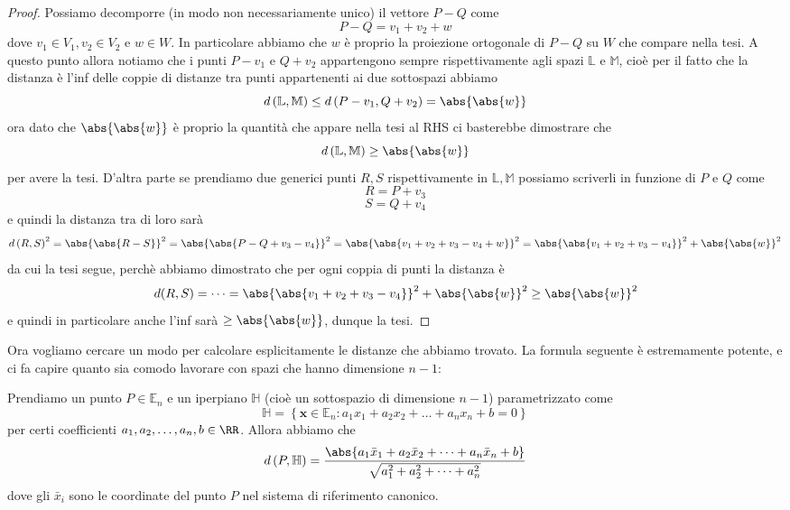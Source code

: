 \documentclass[11pt]{scrartcl}
\begin{document}
   	 \begin{proof}
   	 	Possiamo decomporre (in modo non necessariamente unico) il vettore $P-Q$ come
   	 	$$P-Q=v_1+v_2+w$$
   	 	dove $v_1\in V_1,v_2\in V_2$ e $w\in W$. In particolare abbiamo che $w$ è proprio la proiezione ortogonale di $P-Q$ su $W$ che compare nella tesi. A questo punto allora notiamo che i punti $P-v_1$ e $Q+v_2 $ appartengono sempre rispettivamente agli spazi $\mathbb{L}$ e $\mathbb{M}$, cioè per il fatto che la distanza è l'inf delle coppie di distanze tra punti appartenenti ai due sottospazi abbiamo
   	 	$$d\left(\mathbb{L},\mathbb{M}\right)\le d\left(P-v_1,Q+v_2\right)=\abs{\abs{w}}$$ 
   	 	ora dato che $\abs{\abs{w}}$ è proprio la quantità che appare nella tesi al RHS ci basterebbe dimostrare che 
   	 	$$d\left(\mathbb{L},\mathbb{M}\right)\ge \abs{\abs{w}}$$
   	 	per avere la tesi. D'altra parte se prendiamo due generici punti $R,S$ rispettivamente in $\mathbb{L},\mathbb{M}$ possiamo scriverli in funzione di $P$ e $Q$ come
   	 	$$R=P+v_3$$
   	 	$$S=Q+v_4$$
   	 	e quindi la distanza tra di loro sarà
   	 	$$d\left(R,S\right)^2=\abs{\abs{R-S}}^2=\abs{\abs{P-Q+v_3-v_4}}^2=\abs{\abs{v_1+v_2+v_3-v_4+w}}^2=\abs{\abs{v_1+v_2+v_3-v_4}}^2+\abs{\abs{w}}^2$$
   	 	da cui la tesi segue, perchè abbiamo dimostrato che per ogni coppia di punti la distanza è 
   	 	$$d(R,S)=\dots =\abs{\abs{v_1+v_2+v_3-v_4}}^2+\abs{\abs{w}}^2\ge \abs{\abs{w}}^2$$
   	 	e quindi in particolare anche l'inf sarà $\ge \abs{\abs{w}}$, dunque la tesi.
   	 \end{proof}
   	 Ora vogliamo cercare un modo per calcolare esplicitamente le distanze che abbiamo trovato. La formula seguente è estremamente potente, e ci fa capire quanto sia comodo lavorare con spazi che hanno dimensione $n-1$:
   	 \begin{lemma}
   	 	Prendiamo un punto $P\in\mathbb{E}_n$ e un iperpiano $\mathbb{H}$ (cioè un sottospazio di dimensione $n-1$) parametrizzato come
   	 	$$\mathbb{H}=\left\{\mathbf{x}\in\mathbb{E}_n:a_1x_1+a_2x_2+\dots+a_nx_n+b=0\right\}$$
   	 	per certi coefficienti $a_1,a_2,\dots,a_n,b\in\RR$. Allora abbiamo che 
   	 	$$d\left(P,\mathbb{H}\right)=\frac{\abs{a_1\bar{x}_1+a_2\bar{x}_2+\dots+a_n\bar{x}_n+b}}{\sqrt{a_1^2+a_2^2+\dots+a_n^2}}$$
   	 	dove gli $\bar{x}_i$ sono le coordinate del punto $P$ nel sistema di riferimento canonico.
   	 \end{lemma}
\end{document}
